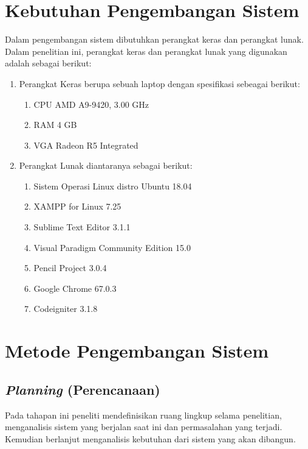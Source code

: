 \section{Kebutuhan Pengembangan Sistem}
    Dalam pengembangan sistem dibutuhkan perangkat keras dan perangkat lunak. Dalam penelitian ini, perangkat keras dan perangkat lunak yang digunakan adalah sebagai berikut:
	    \begin{enumerate}
	        \itemsep0em
	        \item Perangkat Keras berupa sebuah laptop dengan spesifikasi sebeagai berikut:
	            \begin{enumerate}[label=\alph*.]
	                \itemsep0em
	                \item CPU AMD A9-9420, 3.00 GHz
	                \item RAM 4 GB
	                \item VGA Radeon R5 Integrated
	            \end{enumerate}
	        \item Perangkat Lunak diantaranya sebagai berikut:
	            \begin{enumerate}[label=\alph*.]
	                \itemsep0em
	                \item Sistem Operasi Linux distro Ubuntu 18.04
	                \item XAMPP for Linux 7.25
	                \item Sublime Text Editor 3.1.1
	                \item Visual Paradigm Community Edition 15.0
	                \item Pencil Project 3.0.4
	                \item Google Chrome 67.0.3
	                \item Codeigniter 3.1.8
	            \end{enumerate}
	    \end{enumerate}

\section{Metode Pengembangan Sistem}
\subsection{\emph{Planning} (Perencanaan)}
Pada tahapan ini peneliti mendefinisikan ruang lingkup selama penelitian, menganalisis sistem yang berjalan saat ini dan permasalahan yang terjadi. Kemudian berlanjut menganalisis kebutuhan dari sistem yang akan dibangun.

